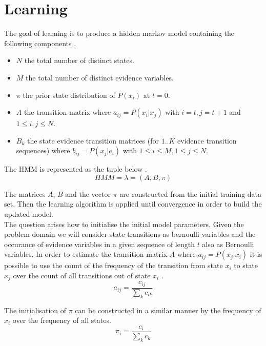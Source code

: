 \documentclass[11pt]{article}
\begin{document}
\section{Learning}

The goal of learning is to produce a hidden markov model containing the following components \cite{rab}.
\begin{itemize}

\item $N$ the total number of distinct states.

\item $M$ the total number of distinct evidence variables.

\item $\pi$ the prior state distribution of $P(x_i)$ at $t = 0$.

\item $A$ the transition matrix where $a_{ij} = P(x_i|x_j)$ with $i = t, j=t+1$ and $1 \le i,j \le N$.

\item $B_k$ the state evidence transition matrices (for $1..K$ evidence transition sequences) where $b_{ij} = P(x_j|e_i)$ with $1 \le i \le M, 1 \le j \le N$.

\end{itemize}

The HMM is represented as the tuple below \cite{rab}.
$$
HMM = \lambda = (A, B, \pi)
$$

The matrices $A$, $B$ and the vector $\pi$ are constructed from the initial training data set. Then the learning algorithm is applied until convergence in order to build the updated model.\\

The question arises how to initialise the initial model parameters. Given the problem domain we will consider state transitions as bernoulli variables and the occurance of evidence variables in a given sequence of length $t$ also as Bernoulli variables. In order to estimate the transition matrix $A$ where $a_{ij} = P(x_j | x_i)$ it is possible to use the count of the frequency of the transition from state $x_i$ to state $x_j$ over the count of all transitions out of state $x_i$ \cite{dm}.
$$
a_{ij} = \frac{c_{ij}}{\sum_k c_{ik}}
$$

The initialisation of $\pi$ can be constructed in a similar manner by the frequency of $x_i$ over the frequency of all states.
$$
\pi_i = \frac{c_i}{\sum_k c_k}
$$
\end{document}
